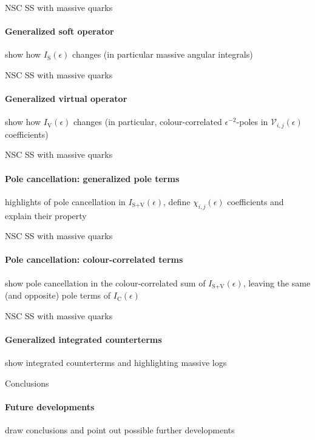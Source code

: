 
\begin{frame}{NSC SS with massive quarks}
  \framesubtitle{Generalized soft operator}

  show how $ I_\text{S}(\epsilon) $ changes (in particular massive angular integrals)

\end{frame}


\begin{frame}{NSC SS with massive quarks}
  \framesubtitle{Generalized virtual operator}

  show how $ I_\text{V}(\epsilon) $ changes (in particular, colour-correlated $ \epsilon^{-2} $-poles in $ \mathcal{V}_{i,j}(\epsilon) $ coefficients)

\end{frame}


\begin{frame}{NSC SS with massive quarks}
  \framesubtitle{Pole cancellation: generalized pole terms}

  highlights of pole cancellation in $ I_{\text{S}+\text{V}}(\epsilon) $, define $ \chi_{i,j}(\epsilon) $ coefficients and explain their property

\end{frame}


\begin{frame}{NSC SS with massive quarks}
  \framesubtitle{Pole cancellation: colour-correlated terms}

  show pole cancellation in the colour-correlated sum of $ I_{\text{S}+\text{V}}(\epsilon) $, leaving the same (and opposite) pole terms of $ I_\text{C}(\epsilon) $

\end{frame}


\begin{frame}{NSC SS with massive quarks}
  \framesubtitle{Generalized integrated counterterms}

  show integrated counterterms and highlighting massive logs

\end{frame}



\begin{frame}{Conclusions}
  \framesubtitle{Future developments}

  draw conclusions and point out possible further developments

\end{frame}










